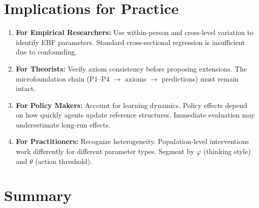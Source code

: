 \section{Implications for Practice}
\label{sec:az-practice}

\begin{tcolorbox}[colback=green!5!white, colframe=green!75!black,
    title=Practical Implications]
\begin{enumerate}
\item \textbf{For Empirical Researchers:} Use within-person and cross-level
variation to identify EBF parameters. Standard cross-sectional regression
is insufficient due to confounding.

\item \textbf{For Theorists:} Verify axiom consistency before proposing extensions.
The microfoundation chain (P1--P4 $\to$ axioms $\to$ predictions) must remain intact.

\item \textbf{For Policy Makers:} Account for learning dynamics. Policy effects
depend on how quickly agents update reference structures. Immediate evaluation
may underestimate long-run effects.

\item \textbf{For Practitioners:} Recognize heterogeneity. Population-level
interventions work differently for different parameter types. Segment by
$\varphi$ (thinking style) and $\theta$ (action threshold).
\end{enumerate}
\end{tcolorbox}



\section{Summary}
\label{sec:az-summary}

